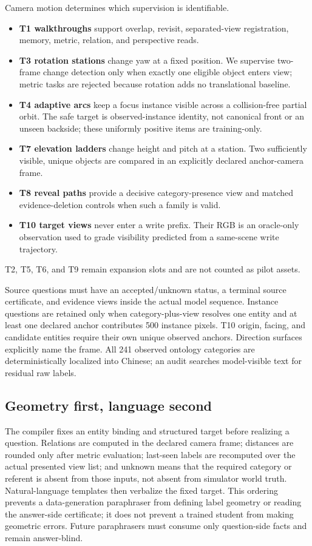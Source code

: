 Camera motion determines which supervision is identifiable.
\begin{itemize}
  \item \textbf{T1 walkthroughs} support overlap, revisit, separated-view
        registration, memory, metric, relation, and perspective reads.
  \item \textbf{T3 rotation stations} change yaw at a fixed position.  We
        supervise two-frame change detection only when exactly one eligible
        object enters view; metric tasks are rejected because rotation adds no
        translational baseline.
  \item \textbf{T4 adaptive arcs} keep a focus instance visible across a
        collision-free partial orbit.  The safe target is observed-instance
        identity, not canonical front or an unseen backside; these uniformly
        positive items are training-only.
  \item \textbf{T7 elevation ladders} change height and pitch at a station.
        Two sufficiently visible, unique objects are compared in an explicitly
        declared anchor-camera frame.
  \item \textbf{T8 reveal paths} provide a decisive category-presence view and
        matched evidence-deletion controls when such a family is valid.
  \item \textbf{T10 target views} never enter a write prefix.  Their RGB is an
        oracle-only observation used to grade visibility predicted from a
        same-scene write trajectory.
\end{itemize}
T2, T5, T6, and T9 remain expansion slots and are not counted as pilot assets.

Source questions must have an accepted/unknown status, a terminal source
certificate, and evidence views inside the actual model sequence.  Instance
questions are retained only when category-plus-view resolves one entity and at
least one declared anchor contributes 500 instance pixels.  T10 origin,
facing, and candidate entities require their own unique observed anchors.
Direction surfaces explicitly name the frame.  All 241 observed ontology
categories are deterministically localized into Chinese; an audit searches
model-visible text for residual raw labels.

\subsection{Geometry first, language second}

The compiler fixes an entity binding and structured target before realizing a
question.  Relations are computed in the declared camera frame; distances are
rounded only after metric evaluation; last-seen labels are recomputed over the
actual presented view list; and unknown means that the required category or
referent is absent from those inputs, not absent from simulator world truth.
Natural-language templates then verbalize the fixed target.  This ordering
prevents a data-generation paraphraser from defining label geometry or reading
the answer-side certificate; it does not prevent a trained student from making
geometric errors.  Future paraphrasers must consume only question-side facts
and remain answer-blind.

